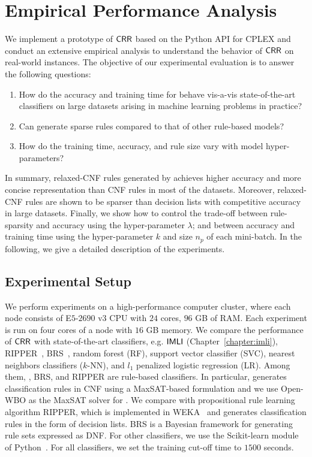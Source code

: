 \section{Empirical Performance Analysis}\label{interpretability_crr_sec:experiment}
We implement a prototype  of  $ \mathsf{CRR} $ based on the  Python API for CPLEX  and conduct an extensive  empirical analysis to understand the behavior of $\mathsf{CRR}$ on real-world instances. The objective of our experimental evaluation is to answer the following questions:


\begin{enumerate}
	\item How do the accuracy and training time for  {\crr}  behave vis-a-vis state-of-the-art classifiers on large datasets arising in machine learning problems in practice?
	\item Can {\crr} generate sparse rules compared to that of  other rule-based models? 
	\item How do the training time, accuracy, and rule size vary with model hyper-parameters?
\end{enumerate}


In summary, relaxed-CNF rules generated by {\crr} achieves higher accuracy and more concise representation than CNF rules in most of the datasets. Moreover, relaxed-CNF rules are shown to be sparser than decision lists with competitive accuracy in large datasets.  Finally, we show how to control the trade-off between rule-sparsity and accuracy using the hyper-parameter $ \lambda $; and between accuracy and training time using the hyper-parameter $ k $ and size $ n_p $ of each mini-batch. In the following, we give a detailed description of the experiments. 



\subsection{Experimental Setup}
We perform experiments on a high-performance computer cluster, where each node consists of E$ 5$-$2690\text{ v}3 $ CPU with $ 24 $ cores, $ 96 $ GB of RAM. Each experiment is run on four cores of a node with $ 16 $ GB memory.   We compare the performance of  $ \mathsf{CRR} $   with  state-of-the-art classifiers, e.g. $ \mathsf{IMLI}  $ (Chapter~\ref{chapter:imli}), RIPPER~\cite{cohen1995fast}, BRS~\cite{wang2017bayesian},  random forest (RF), support vector classifier (SVC), nearest neighbors classifiers ($ k $-NN), and $ l_1 $ penalized logistic regression (LR). Among them, {\IMLI}, BRS, and RIPPER are rule-based classifiers. In particular,
{\IMLI} generates classification rules in CNF using a MaxSAT-based formulation and we use Open-WBO \cite{martins2014open} as the MaxSAT solver for {\IMLI}. We compare with propositional rule learning algorithm RIPPER, which is implemented in WEKA~\cite{HFHPRW2009} and generates classification rules in the form of decision lists. BRS is a Bayesian framework for generating rule sets expressed as DNF. For  other classifiers, we use the Scikit-learn module of Python~\cite{scikit-learn}. For all  classifiers, we set the training cut-off time to $ 1500 $  {seconds}. 

